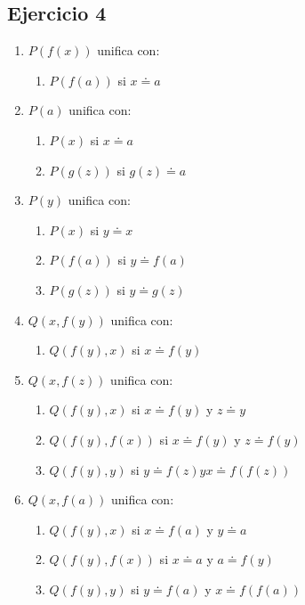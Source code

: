 \documentclass[10pt,a4paper]{article}
\begin{document}
\subsection{Ejercicio 4}
    \begin{enumerate}
    \item $P(f(x)) $ unifica con:
        \begin{enumerate}
        \item $P(f(a)) $ si $ x \doteq a$
        \end{enumerate}
    \item $P(a) $ unifica con:
        \begin{enumerate}
            \item $P(x) $ si $ x \doteq a$
            \item $P(g(z)) $ si $ g(z) \doteq a$
        \end{enumerate}
    \item $P(y) $ unifica con:
        \begin{enumerate}
            \item $P(x) $ si $ y \doteq x$
            \item $P(f(a)) $ si $ y \doteq f(a)$
            \item $P(g(z)) $ si $ y \doteq g(z)$
        \end{enumerate}
    \item $Q(x,f(y)) $ unifica con:
        \begin{enumerate}
            \item $Q(f(y),x) $ si $ x \doteq f(y)$
        \end{enumerate}
    \item $Q(x,f(z)) $ unifica con:
        \begin{enumerate}
            \item $Q(f(y),x) $ si $ x \doteq f(y) $ y $ z \doteq y$
            \item $Q(f(y),f(x)) $ si $ x \doteq f(y) $ y $ z \doteq f(y)$
            \item $Q(f(y),y) $ si $ y \doteq f(z) y x \doteq f(f(z))$
        \end{enumerate}
    \item $Q(x,f(a)) $ unifica con:
        \begin{enumerate}
            \item $Q(f(y),x) $ si $ x \doteq f(a) $ y $ y \doteq a$
            \item $Q(f(y),f(x)) $ si $ x \doteq a $ y $ a \doteq f(y)$
            \item $Q(f(y),y) $ si $ y \doteq f(a) $ y $ x \doteq f(f(a))$
        \end{enumerate}
    \end{enumerate}
\end{document}
